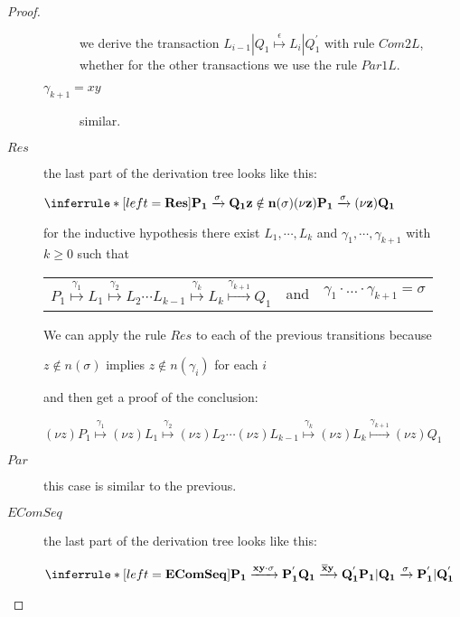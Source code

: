 \begin{proposition}
\begin{proof}
\begin{description}
\begin{description}
	    we derive the transaction $ L_{i-1}|Q_{1} \stackrel{\epsilon}{\longmapsto} L_{i}|Q_{1}^{'}$ with rule $Com2L$, whether for the other transactions  we use the rule $Par1L$.
	  \item[$\gamma_{k+1}=xy$] similar.
	\end{description}
      \item[$Res$]
	the last part of the derivation tree looks like this:
	\begin{center}
	  $\inferrule* [left=\bf{Res}]{
	      P_{1} \xrightarrow{\sigma} Q_{1}
	    \\
	      z\notin n(\sigma)
	  }{
	    (\nu z) P_{1} \xrightarrow{\sigma} (\nu z) Q_{1}
	  }$
	\end{center}
	for the inductive hypothesis there exist $L_{1}, \cdots, L_{k}$ and $\gamma_{1}, \cdots, \gamma_{k+1}$ with $k\geq 0$ such that 
	\begin{center}
	  \begin{tabular}{lll}
	    $P_{1} \stackrel{\gamma_{1}}{\longmapsto} L_{1}  \stackrel{\gamma_{2}}{\longmapsto} L_{2} \cdots L_{k-1} \stackrel{\gamma_{k}}{\longmapsto} L_{k} \stackrel{\gamma_{k+1}}{\longmapsto} Q_{1}$ 
	  &
	    and
	  &
	    $\gamma_{1} \cdot \ldots \cdot \gamma_{k+1} =  \sigma$
	  \end{tabular}
	\end{center}
	We can apply the rule $Res$ to each of the previous transitions because 
	\begin{center}
	  $z\notin n(\sigma)$ implies $z\notin n(\gamma_{i})$ for each $i$
	\end{center}
	and then get a proof of the conclusion:
	\begin{center}
	  $(\nu z)P_{1} \stackrel{\gamma_{1}}{\longmapsto} (\nu z)L_{1}  \stackrel{\gamma_{2}}{\longmapsto} (\nu z)L_{2} \cdots (\nu z)L_{k-1} \stackrel{\gamma_{k}}{\longmapsto} (\nu z)L_{k} \stackrel{\gamma_{k+1}}{\longmapsto} (\nu z)Q_{1}$
	\end{center}
      \item[$Par$] this case is similar to the previous.
      \item[$EComSeq$] 
	the last part of the derivation tree looks like this:
	\begin{center}
	  $\inferrule* [left=\bf{EComSeq}]{
	      P_{1} \xrightarrow{xy \cdot \sigma} P_{1}^{'}
	    \\
	      Q_{1} \xrightarrow{\overline{x}y} Q_{1}^{'}
	  }{
	    P_{1}|Q_{1} \xrightarrow{\sigma} P_{1}^{'}|Q_{1}^{'}
	  }$
	\end{center}

\end{description}
\end{proof}
\end{proposition}
